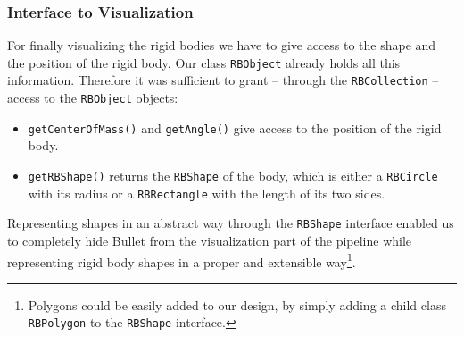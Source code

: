 \subsubsection{Interface to Visualization}

For finally visualizing the rigid bodies we have to give access to the shape and the position of the rigid body. Our class \texttt{RBObject} already holds all this information. Therefore it was sufficient to grant -- through the \texttt{RBCollection} -- access to the \texttt{RBObject} objects:
\begin{itemize}
\item \texttt{getCenterOfMass()} and \texttt{getAngle()} give access to the position of the rigid body.
\item \texttt{getRBShape()} returns the \texttt{RBShape} of the body, which is either a \texttt{RBCircle} with its radius or a \texttt{RBRectangle} with the length of its two sides.
\end{itemize}
Representing shapes in an abstract way through the \texttt{RBShape} interface enabled us to completely hide Bullet from the visualization part of the pipeline while representing rigid body shapes in a proper and extensible way\footnote{Polygons could be easily added to our design, by simply adding a child class \texttt{RBPolygon} to the \texttt{RBShape} interface.}. 
